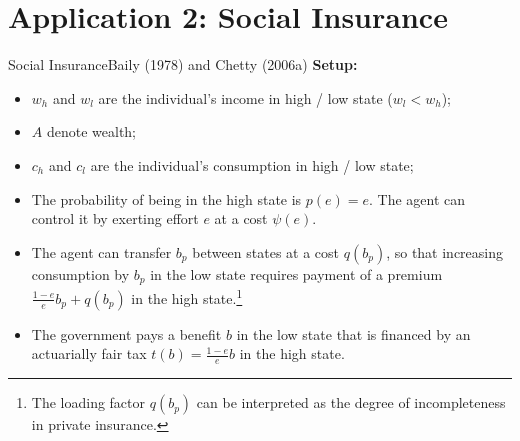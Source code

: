 \documentclass{beamer}
\begin{document}
\section{Application 2: Social Insurance}
\begin{frame}[shrink]
	\transfade %
	\tableofcontents[sectionstyle=show/shaded,subsectionstyle=show/shaded/hide]
	\addtocounter{framenumber}{-1}
\end{frame}
\begin{frame}{Social Insurance}{Baily (1978) and Chetty (2006a)}
	\textbf{Setup:}
	\begin{itemize}
		\item $w_h$ and $w_l$ are the individual's income in high / low state ($w_l<w_h$);
		\item $A$ denote wealth;
		\item $c_h$ and $c_l$ are the individual's consumption in high / low state;
		\item The probability of being in the high state is $p(e)=e$. The agent can control it by exerting effort $e$ at a cost $\psi(e)$.
		\item The agent can transfer $b_p$ between states at a cost $q(b_p)$, so that increasing consumption by $b_p$ in the low state requires payment of a premium $\frac{1-e}{e}b_p+q(b_p)$ in the high state.\footnote{The loading factor $q(b_p)$ can be interpreted as the degree of incompleteness in private insurance.}
		\item The government pays a benefit $b$ in the low state that is financed by an actuarially fair tax $t(b)=\frac{1-e}{e}b$ in the high state.
	\end{itemize}
\end{frame}
\end{document}
